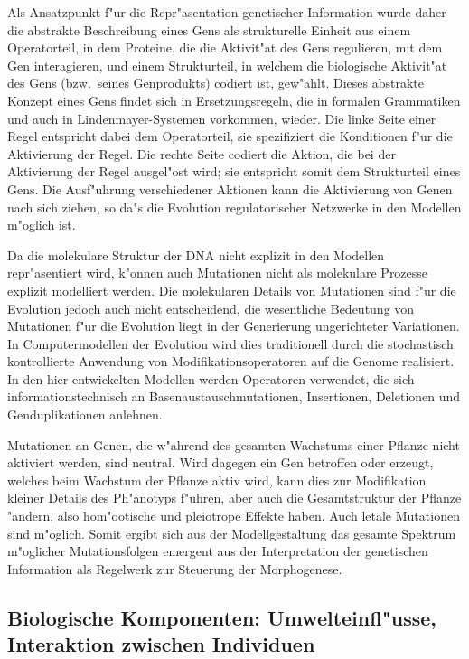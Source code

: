Als Ansatzpunkt f"ur die Repr"asentation genetischer Information wurde
daher die abstrakte Beschreibung eines Gens als strukturelle Einheit aus
einem Operatorteil, in dem Proteine, die die Aktivit"at des Gens regulieren,
mit dem Gen interagieren, und einem Strukturteil, in welchem die biologische
Aktivit"at des Gens (bzw.\ seines Genprodukts) codiert ist, gew"ahlt. Dieses
abstrakte Konzept eines Gens findet sich in Ersetzungsregeln, die in formalen
Grammatiken und auch in Lindenmayer-Systemen vorkommen, wieder. Die linke Seite
einer Regel entspricht dabei dem Operatorteil, sie spezifiziert die Konditionen
f"ur die Aktivierung der Regel. Die rechte Seite codiert die Aktion, die bei der
Aktivierung der Regel ausgel"ost wird; sie entspricht somit dem Strukturteil
eines Gens. Die Ausf"uhrung verschiedener Aktionen kann die Aktivierung von Genen
nach sich ziehen, so da"s die Evolution regulatorischer Netzwerke in den Modellen
m"oglich ist.

Da die molekulare Struktur der DNA nicht explizit in den Modellen repr"asentiert
wird, k"onnen auch Mutationen nicht als molekulare Prozesse explizit modelliert
werden. Die molekularen Details von Mutationen sind f"ur die Evolution jedoch
auch nicht entscheidend, die wesentliche Bedeutung von Mutationen f"ur die
Evolution liegt in der Generierung ungerichteter Variationen. In Computermodellen
der Evolution wird dies traditionell durch die stochastisch kontrollierte Anwendung von
Modifikationsoperatoren auf die Genome realisiert. In den hier entwickelten
Modellen werden Operatoren verwendet, die sich informationstechnisch an
Basenaustauschmutationen, Insertionen, Deletionen und Genduplikationen
anlehnen.

Mutationen an Genen, die
w"ahrend des gesamten Wachstums einer Pflanze nicht aktiviert werden, sind neutral.
Wird dagegen ein Gen betroffen oder erzeugt, welches beim Wachstum der Pflanze
aktiv wird, kann dies zur Modifikation kleiner Details des Ph"anotyps f"uhren, aber
auch die Gesamtstruktur der Pflanze "andern, also hom"ootische und pleiotrope
Effekte haben. Auch letale Mutationen sind m"oglich. Somit ergibt sich aus der
Modellgestaltung das gesamte Spektrum m"oglicher Mutationsfolgen emergent aus der
Interpretation der genetischen Information als Regelwerk zur Steuerung der
Morphogenese.


\subsection{Biologische Komponenten: Umwelteinfl"usse, Interaktion zwischen Individuen}
\label{biodescr}

